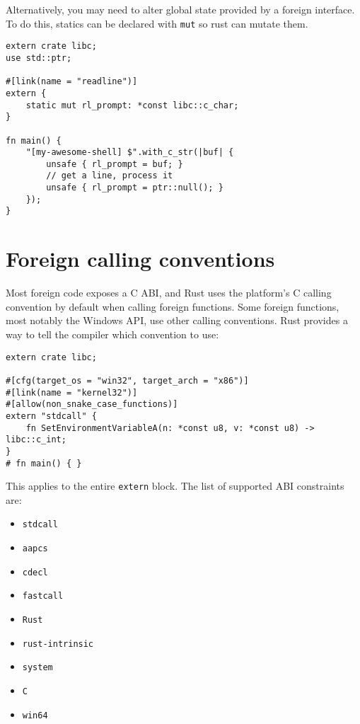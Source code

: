 \documentclass[]{article}
\begin{document}
Alternatively, you may need to alter global state provided by a foreign
interface. To do this, statics can be declared with \texttt{mut} so rust
can mutate them.

\begin{verbatim}
extern crate libc;
use std::ptr;

#[link(name = "readline")]
extern {
    static mut rl_prompt: *const libc::c_char;
}

fn main() {
    "[my-awesome-shell] $".with_c_str(|buf| {
        unsafe { rl_prompt = buf; }
        // get a line, process it
        unsafe { rl_prompt = ptr::null(); }
    });
}
\end{verbatim}

\section{Foreign calling conventions}\label{foreign-calling-conventions}

Most foreign code exposes a C ABI, and Rust uses the platform's C
calling convention by default when calling foreign functions. Some
foreign functions, most notably the Windows API, use other calling
conventions. Rust provides a way to tell the compiler which convention
to use:

\begin{verbatim}
extern crate libc;

#[cfg(target_os = "win32", target_arch = "x86")]
#[link(name = "kernel32")]
#[allow(non_snake_case_functions)]
extern "stdcall" {
    fn SetEnvironmentVariableA(n: *const u8, v: *const u8) -> libc::c_int;
}
# fn main() { }
\end{verbatim}

This applies to the entire \texttt{extern} block. The list of supported
ABI constraints are:

\begin{itemize}
\itemsep1pt\parskip0pt
\item
  \texttt{stdcall}
\item
  \texttt{aapcs}
\item
  \texttt{cdecl}
\item
  \texttt{fastcall}
\item
  \texttt{Rust}
\item
  \texttt{rust-intrinsic}
\item
  \texttt{system}
\item
  \texttt{C}
\item
  \texttt{win64}
\end{itemize}
\end{document}
